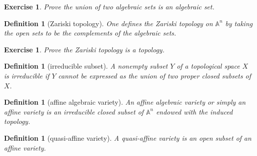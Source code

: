 \documentclass[12pt]{report}
\newtheorem{definition}[proposition]{Definition}
\newtheorem{ex}[proposition]{Exercise}
\begin{document}
\begin{ex}
	Prove the union of two algebraic sets is an algebraic set.
\end{ex}		

\begin{definition}[Zariski topology]
	One defines the Zariski topology on $\mathbb{A}^n$ by taking the open sets to be the complements of the algebraic sets.
\end{definition}

\begin{ex}
	Prove the Zariski topology is a topology. 
\end{ex}

\begin{definition}[irreducible subset]
	A nonempty subset $Y$ of a topological space $X$ is irreducible if $Y$ cannot be expressed as the union of two proper closed subsets of $X$. 
\end{definition}

\begin{definition}[affine algebraic variety]
	An affine algebraic variety or simply an affine variety is an irreducible closed subset of $\mathbb{A}^n$ endowed with the induced topology. 
\end{definition}

\begin{definition}[quasi-affine variety]
	A quasi-affine variety is an open subset of an affine variety. 
\end{definition}					

		
\end{document}
